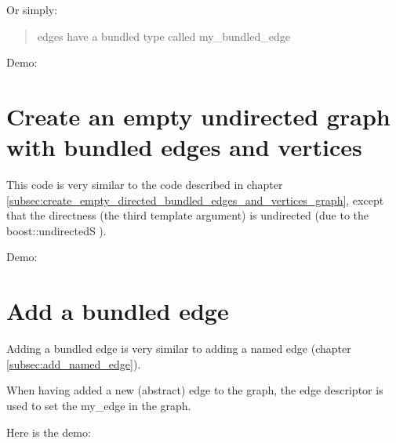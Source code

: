 Or simply: 

\begin{quote}
edges have a bundled type called my\_bundled\_edge
\end{quote}

Demo:



\section{Create an empty undirected graph with bundled edges and vertices}
\label{subsec:create_empty_undirected_bundled_edges_and_vertices_graph}



This code is very similar to the code described in chapter 
\ref{subsec:create_empty_directed_bundled_edges_and_vertices_graph}, 
except that the directness (the third template argument) is undirected
 (due to the boost::undirectedS ).

Demo:



\section{Add a bundled edge}
\label{subsec:add_bundled_edge}

Adding a bundled edge is very similar to adding a named edge (chapter 
\ref{subsec:add_named_edge}).



When having added a new (abstract) edge to the graph, the edge descriptor
is used to set the my_edge in the graph.

Here is the demo:



